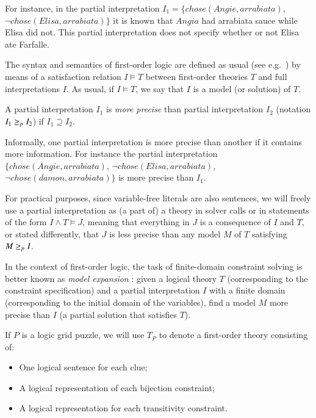 For instance, in the partial interpretation $I_1=\{chose(Angie,arrabiata),$ $\lnot chose(Elisa,arrabiata)\}$ it is known that $Angia$ had arrabiata sauce while Elisa did not. This partial interpretation does not specify whether or not Elisa ate Farfalle.  


The syntax and semantics of first-order logic are defined as usual (see e.g.\ \cite{enderton}) by means of a satisfaction relation $I \models T$ between first-order theories $T$ and full interpretations $I$. As usual, if $I\models T$, we say that $I$ is a model (or solution) of $T$.


\begin{definition} %
	A partial interpretation $I_1$ is \emph{more precise} than partial interpretation $I_2$ (notation $I_1\geq_p I_2$) if $I_1\supseteq I_2$.
\end{definition}

Informally, one partial interpretation is more precise than another if it contains more information. For instance the partial interpretation $\{chose(Angie,arrabiata)$, $\lnot chose(Elisa,arrabiata)$, $ \lnot chose(damon,arrabiata)\}$ is more precise than $I_1$. 


For practical purposes, since variable-free literals are also sentences, we will freely use a partial interpretation as (a part of) a theory in solver calls or in statements of the form $I\land T \models J$, meaning that everything in $J$ is a consequence of $I$ and $T$, or stated differently, that $J$ is less precise than any model $M$ of $T$ satisfying $M\geq_p I$. 

In the context of first-order logic, the task of finite-domain constraint solving is better known as \emph{model expansion} \cite{MitchellTHM06}: given a logical theory $T$ (corresponding to the constraint specification) and a partial interpretation $I$ with a finite domain (corresponding to the initial domain of the variables), find a model $M$ more precise than $I$ (a partial solution that satisfies $T$).

If $P$ is a logic grid puzzle, we will use $T_P$ to denote a first-order theory consisting of:
\begin{itemize}
 \item One logical sentence for each clue;
 \item A logical representation of each bijection constraint;
 \item A logical representation for each transitivity constraint.
\end{itemize}

